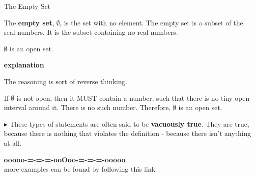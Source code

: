 \documentclass{ximera}
\begin{document}
\begin{example}  The Empty Set 


The \textbf{empty set}, $\emptyset$, is the set with no element.  The empty set is a subset of the real numbers.  It is the subset containing no real numbers. 


$\emptyset$ is an open set. 



\textbf{\textcolor{red!75!green}{explanation}} 


The reasoning is sort of reverse thinking.  

If $\emptyset$ is not open, then it MUST contain a number, such that there is no tiny open interval around it.  There is no such number.  Therefore, $\emptyset$ is an open set.



\end{example}

$\blacktriangleright$ These types of statements are often said to be \textbf{vacuously true}.  They are true, because there is nothing that violates the definition - because there isn't anything at all. 












\begin{onlineOnly}
\begin{center}
\textbf{\textcolor{green!50!black}{ooooo-=-=-=-ooOoo-=-=-=-ooooo}} \\

more examples can be found by following this link\\ 

\end{center}
\end{onlineOnly}
\end{document}
